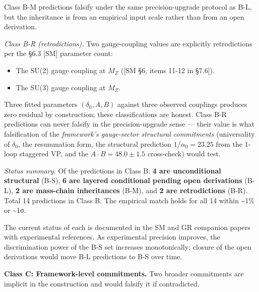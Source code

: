 \documentclass[
]{article}
\providecommand{\tightlist}{%
  \setlength{\itemsep}{0pt}\setlength{\parskip}{0pt}}
\begin{document}
Class B-M predictions falsify under the same precision-upgrade protocol
as B-L, but the inheritance is from an empirical input scale rather than
from an open derivation.

\emph{Class B-R (retrodictions).} Two gauge-coupling values are
explicitly retrodictions per the §6.3 {[}SM{]} parameter count:

\begin{itemize}
\tightlist
\item
  The SU(2) gauge coupling at \(M_Z\) ({[}SM §6, items 11-12 in
  §7.6{]}).
\item
  The SU(3) gauge coupling at \(M_Z\).
\end{itemize}

Three fitted parameters \((\delta_0, A, B)\) against three observed
couplings produces zero residual by construction; these classifications
are honest. Class B-R predictions can never falsify in the
precision-upgrade sense --- their value is what falsification of the
\emph{framework's gauge-sector structural commitments} (universality of
\(\delta_0\), the resummation form, the structural prediction
\(1/\alpha_0 = 23.25\) from the 1-loop staggered VP, and the
\(A \cdot B = 48.0 \pm 1.5\) cross-check) would test.

\emph{Status summary.} Of the predictions in Class B: \textbf{4 are
unconditional structural} (B-S), \textbf{6 are layered conditional
pending open derivations} (B-L), \textbf{2 are mass-chain inheritances}
(B-M), and \textbf{2 are retrodictions} (B-R). Total 14 predictions in
Class B. The empirical match holds for all 14 within \textasciitilde1\%
or \textasciitilde1σ.

The current status of each is documented in the SM and GR companion
papers with experimental references. As experimental precision improves,
the discrimination power of the B-S set increases monotonically; closure
of the open derivations would move B-L predictions to B-S over time.

\textbf{Class C: Framework-level commitments.} Two broader commitments
are implicit in the construction and would falsify it if contradicted.
\end{document}
